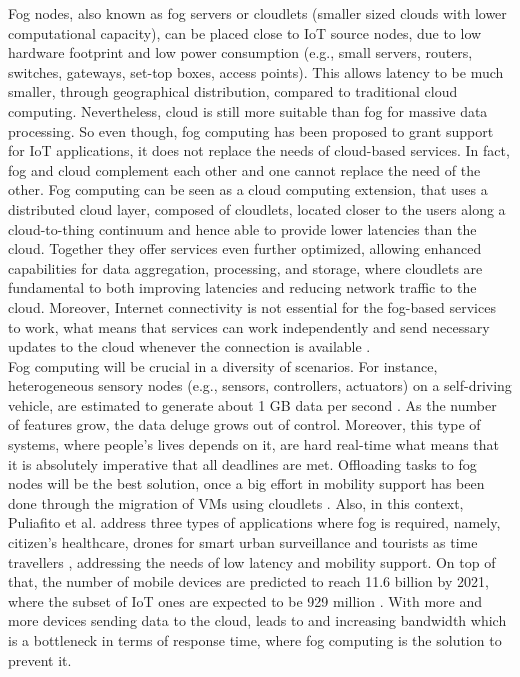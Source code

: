 Fog nodes, also known as fog servers or cloudlets (smaller sized clouds with lower computational capacity), can be placed close to IoT source nodes, due to low hardware footprint and low power consumption (e.g., small servers, routers, switches, gateways, set-top boxes, access points). This allows latency to be much smaller, through geographical distribution, compared to traditional cloud computing. Nevertheless, cloud is still more suitable than fog for massive data processing. So even though, fog computing has been proposed to grant support for IoT applications, it does not replace the needs of cloud-based services. In fact, fog and cloud complement each other and one cannot replace the need of the other. Fog computing can be seen as a cloud computing extension, that uses a distributed cloud layer, composed of cloudlets, located closer to the users along a cloud-to-thing continuum and hence able to provide lower latencies than the cloud. Together they offer services even further optimized, allowing enhanced capabilities for data aggregation, processing, and storage, where cloudlets are fundamental to both improving latencies and reducing network traffic to the cloud. Moreover, Internet connectivity is not essential for the fog-based services to work, what means that services can work independently and send necessary updates to the cloud whenever the connection is available \cite{yousefpour2018all}.\\
\noindent\tab Fog computing will be crucial in a diversity of scenarios. For instance, heterogeneous sensory nodes (e.g., sensors, controllers, actuators) on a self-driving vehicle, are estimated to generate about 1 GB data per second \cite{angelica2013google}. As the number of features grow, the data deluge grows out of control. Moreover, this type of systems, where people's lives depends on it, are hard real-time what means that it is absolutely imperative that all deadlines are met. Offloading tasks to fog nodes will be the best solution, once a big effort in mobility support has been done through the migration of VMs using cloudlets \cite{lopes2017myifogsim}. Also, in this context, Puliafito et al. address three types of applications where fog is required, namely, citizen's healthcare, drones for smart urban surveillance and tourists as time travellers \cite{puliafito2017fog}, addressing the needs of low latency and mobility support. On top of that, the number of mobile devices are predicted to reach 11.6 billion by 2021, where the subset of IoT ones are expected to be 929 million \cite{cisco_2017}. With more and more devices sending data to the cloud, leads to and increasing bandwidth which is a bottleneck in terms of response time, where fog computing is the solution to prevent it.\\
